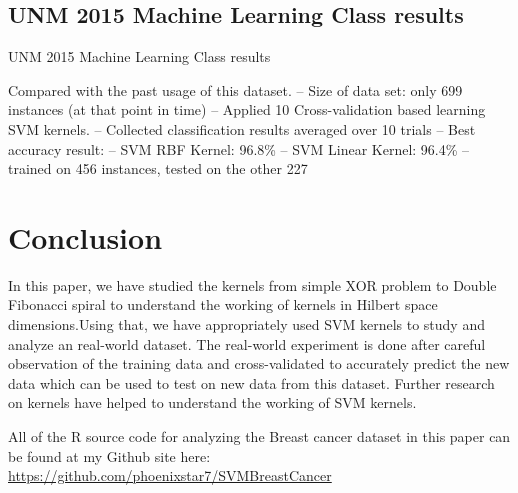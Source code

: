 \documentclass[conference]{IEEEtran}
\begin{document}
\subsection*{UNM 2015 Machine Learning Class results}
\begin{table}[h!]
\center
	\caption{UNM 2015 Machine Learning Class results}
\label{table:My_Results}
 Compared with the past usage of this dataset.
	  -- Size of data set: only 699 instances (at that point in time)
      -- Applied 10 Cross-validation based learning SVM kernels.
      -- Collected classification results averaged over 10 trials
      -- Best accuracy result: 
         -- SVM RBF Kernel: 96.8\%
         -- SVM Linear Kernel: 96.4\%
         -- trained on 456 instances, tested on the other 227
\end{table}

\section{Conclusion}
In this paper, we have studied the kernels from simple XOR problem to Double Fibonacci spiral to understand the working of kernels in Hilbert space dimensions.Using that, we have appropriately used SVM kernels to study and analyze an real-world dataset. The real-world experiment is done after careful observation of the training data and cross-validated to accurately predict the new data which can be used to test on new data from this dataset. Further research on kernels have helped to understand the working of SVM kernels.

All of the R source code for analyzing the Breast cancer dataset in this paper can be found at my Github site here: 
\href{https://github.com/phoenixstar7/SVMBreastCancer}{https://github.com/phoenixstar7/SVMBreastCancer}


%
\end{document}
